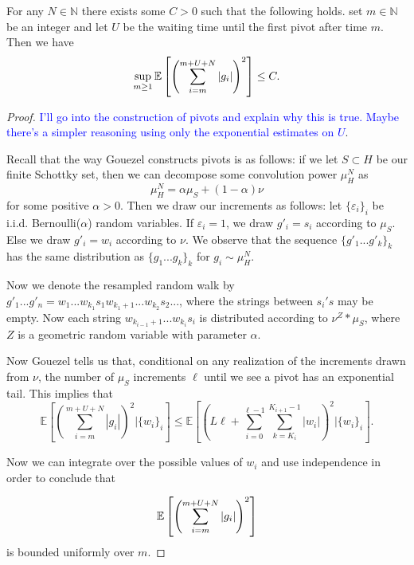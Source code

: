 \begin{lem}\label{lem: small values mn} For any $ N \in \mathbb{N} $ there exists some $ C > 0$ such that the following holds. set $ m \in \mathbb{N} $ be an integer and let $ U $ be the waiting time until the first pivot after time $ m $. Then we have
	$$\sup_{m\ge 1}\mathbb{E}\left[\left( \sum_{i=m}^{m+U+N}|g_i| \right)^2\right]\le C.$$
\end{lem}
\begin{proof}
	\textcolor{blue} { I'll go into the construction of pivots and explain why this is true. Maybe there's a simpler reasoning using only the exponential estimates on $ U $}.
	
	Recall that the way Gouezel constructs pivots is as follows: if we let $ S \subset H$ be our finite Schottky set, then we can decompose some convolution power $ \mu _{H} ^{N} $ as \[ \mu _{H} ^{N} = \alpha \mu _{S} + (1-\alpha)\nu \] for some positive $ \alpha >0$. Then we draw our increments as follows: let $ \{ \varepsilon _{i} \} _{i} $ be i.i.d. Bernoulli($ \alpha $) random variables. If $ \varepsilon _{i} = 1 $, we draw $ g' _{i} = s _{i} $ according to $ \mu _{S} $. Else we draw $g' _{i} = w _{i} $ according to $ \nu $. We observe that the sequence $ \{ g '_{1}...g' _{k} \} _{k} $ has the same distribution as $ \{ g _{1}...g _{k} \} _{k} $ for $ g _{i} \sim \mu _{H} ^{N} $.
	
	Now we denote the resampled random walk by $ g' _{1}...g' _{n} =w _{1}...w _{k _{1}} s _{1} w _{k _{1} +1} ...w _{k _{2}} s _{2} ... $, where the strings between $ s _{i}'s $ may be empty. Now each string $ w _{k _{i-1} +1}...w _{k _{i}} s _{i}  $ is distributed according to $ \nu ^{Z}* \mu _{S} $, where $ Z $ is a geometric random variable with parameter $ \alpha $. 
	
	Now Gouezel tells us that, conditional on any realization of the increments drawn from $ \nu $, the number of $ \mu _{S} $ increments $ \ell $ until we see a pivot has an exponential tail. This implies that
	\[ \mathbb{E} \left[\left(\sum_{i = m}^{m+U+N} |g _{i}| \right) ^{2} | \{ w _{i} \}_i \right] \leq \mathbb{E} \left[\left(L\ell + \sum_{i = 0}^{\ell-1} \sum_{k = K _{i}}^{K _{i+1} -1} |w _{i}|\right) ^{2} | \{ w _{i} \} _{i} \right] .\] 
	
	Now we can integrate over the possible values of $ w _{i} $ and use independence in order to conclude that 
	
	\[ \mathbb{E}\left[\left( \sum_{i=m}^{m+U+N}|g_i| \right)^2\right] \] is bounded uniformly over $ m $.
\end{proof}

